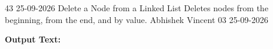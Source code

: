 \clearpage
\label{prog:43}
\programhead
  {43}
  {25-09-2026}
  {Delete a Node from a Linked List}
  {Deletes nodes from the beginning, from the end, and by value.}
  {Abhishek Vincent}
  {03}
  {25-09-2026}

\divider
\textbf{Output Text:}\par
\vspace{2pt}

